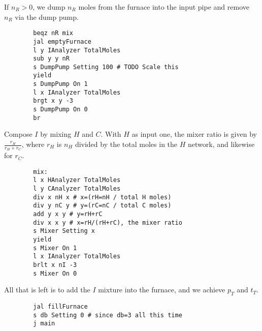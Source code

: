\documentclass{article}
\begin{document}
\vspace{1em}
\begin{paracol}{2}
    If $n_R>0$, we dump $n_R$ moles from the furnace into the input pipe
    and remove $n_R$ via the dump pump.
    \switchcolumn
    \begin{verbatim}
        beqz nR mix
        jal emptyFurnace
        l y IAnalyzer TotalMoles
        sub y y nR
        s DumpPump Setting 100 # TODO Scale this
        yield
        s DumpPump On 1
        l x IAnalyzer TotalMoles
        brgt x y -3
        s DumpPump On 0
        br
    \end{verbatim}
    \switchcolumn*
    \noindent
    Compose $I$ by mixing $H$ and $C$.
    With $H$ as input one, the mixer ratio is given by
    $\frac{r_H}{r_H+r_C}$, where
    $r_H$ is $n_H$ divided by the total moles in the $H$ network,
    and likewise for $r_C$.
    \switchcolumn
    \vspace{-1em}
    \begin{verbatim}
        mix:
        l x HAnalyzer TotalMoles
        l y CAnalyzer TotalMoles
        div x nH x # x=(rH=nH / total H moles)
        div y nC y # y=(rC=nC / total C moles)
        add y x y # y=rH+rC
        div x x y # x=rH/(rH+rC), the mixer ratio
        s Mixer Setting x
        yield
        s Mixer On 1
        l x IAnalyzer TotalMoles
        brlt x nI -3
        s Mixer On 0
    \end{verbatim}
    \switchcolumn*
    \noindent
    All that is left is to add the $I$ mixture into the furnace,
    and we achieve $p_T$ and $t_T$.
    \switchcolumn
    \vspace{-1em}
    \begin{verbatim}
        jal fillFurnace
        s db Setting 0 # since db=3 all this time
        j main
    \end{verbatim}
\end{paracol}
\end{document}
